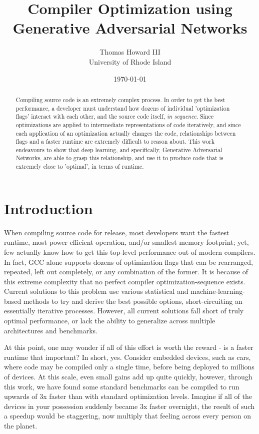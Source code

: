 \documentclass{article}
\title{Compiler Optimization using Generative Adversarial Networks}
\author{
    Thomas Howard III  \\
    University of Rhode Island  \\
}
\date{\today}
\begin{document}
\maketitle

\begin{abstract}
Compiling source code is an extremely complex process. In order to get the best performance, a developer must understand how dozens of individual 'optimization flags' interact with each other, and the source code itself, \textit{in sequence}. Since optimizations are applied to intermediate representations of code iteratively, and since each application of an optimization actually changes the code, relationships between flags and a faster runtime are extremely difficult to reason about. This work endeavours to show that deep learning, and specifically, Generative Adversarial Networks, are able to grasp this relationship, and use it to produce code that is extremely close to 'optimal', in terms of runtime.
\end{abstract}

\section{Introduction}
When compiling source code for release, most developers want the fastest runtime, most power efficient operation, and/or smallest memory footprint; yet, few actually know how to get this top-level performance out of modern compilers. In fact, GCC alone supports dozens of optimization flags that can be rearranged, repeated, left out completely, or any combination of the former. It is because of this extreme complexity that no perfect compiler optimization-sequence exists. Current solutions to this problem use various statistical and machine-learning-based methods to try and derive the best possible options, short-circuiting an essentially iterative processes. However, all current solutions fall short of truly optimal performance, or lack the ability to generalize across multiple architectures and benchmarks.

At this point, one may wonder if all of this effort is worth the reward - is a faster runtime that important? In short, yes. Consider embedded devices, such as cars, where code may be compiled only a single time, before being deployed to millions of devices. At this scale, even small gains add up quite quickly, however, through this work, we have found some standard benchmarks can be compiled to run upwards of 3x faster than with standard optimization levels. Imagine if all of the devices in your possession suddenly became 3x faster overnight, the result of such a speedup would be staggering, now multiply that feeling across every person on the planet.
\end{document}

